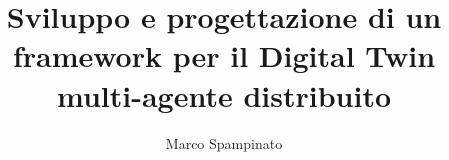 \documentclass[12pt,a4paper,openany,oneside]{book}
\begin{document}


\title{Sviluppo e progettazione di un framework per il Digital Twin multi-agente distribuito}
\author{Marco Spampinato}



\tableofcontents



\newpage
{}

\end{document}
